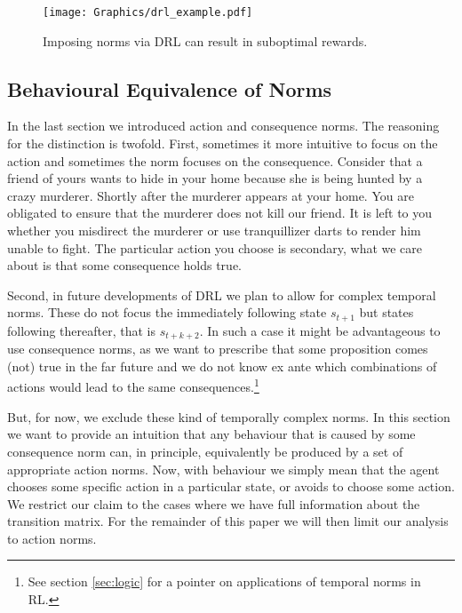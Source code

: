 \begin{figure}[h!]
	\centering
 	\texttt{[image: Graphics/drl\_example.pdf]}
 	\caption{Imposing norms via DRL can result in suboptimal rewards.}
 	\label{fig:drl_example}
\end{figure} 

\subsection{Behavioural Equivalence of Norms}

In the last section we introduced action and consequence norms. The reasoning for the distinction is twofold. First, sometimes it more intuitive to focus on the action and sometimes the norm focuses on the consequence. Consider that a friend of yours wants to hide in your home because she is being hunted by a crazy murderer. Shortly after the murderer appears at your home. You are obligated to ensure that the murderer does not kill our friend. It is left to you whether you misdirect the murderer or use tranquillizer darts to render him unable to fight. The particular action you choose is secondary, what we care about is that some consequence holds true.   

Second, in future developments of DRL we plan to allow for complex temporal norms. These do not focus the immediately following state $s_{t+1}$ but states following thereafter, that is $s_{t+k+2}$. In such a case it might be advantageous to use consequence norms, as we want to prescribe that some proposition comes (not) true in the far future and we do not know ex ante which combinations of actions would lead to the same consequences.\footnote{See section \ref{sec:logic} for a pointer on applications of temporal norms in RL.}    

But, for now, we exclude these kind of temporally complex norms. In this section we want to provide an intuition that any behaviour that is caused by some consequence norm can, in principle, equivalently be produced by a set of appropriate action norms. Now, with behaviour we simply mean that the agent chooses some specific action in a particular state, or avoids to choose some action. We restrict our claim to the cases where we have full information about the transition matrix. For the remainder of this paper we will then limit our analysis to action norms.

